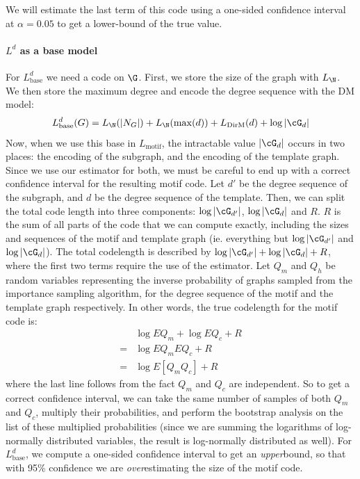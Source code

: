 We will estimate the last term of this code using a one-sided confidence interval at $\alpha=0.05$ to get a lower-bound of the true value. 

\paragraph{$L^d$ as a base model} For $L^d_\text{base}$ we need a code on $\G$. First, we store the size of the graph with $L_\N$. We then store the maximum degree and encode the degree sequence with the DM model:
\[
L^d_\text{base}(G) = L_\N(|N_G|) + L_\N(\max(d)) + L_\text{DirM}(d) + \log |\cG_d|  
\]
Now, when we use this base in $L_\text{motif}$, the intractable value $|\cG_d|$ occurs in two places: the encoding of the subgraph, and the encoding of the template graph. Since we use our estimator for both, we must be careful to end up with a correct confidence interval for the resulting motif code. Let $d'$ be the degree sequence of the subgraph, and $d$ be the degree sequence of the template. Then, we can split the total code length into three components: $\log |\cG_{d'}|$, $\log |\cG_d|$ and $R$. $R$ is the sum of all parts of the code that we can compute exactly, including the sizes and sequences of the motif and template graph (ie. everything but $\log |\cG_{d'}|$ and $\log |\cG_d|$). The total codelength is described by $\log |\cG_{d'}| + \log |\cG_d| + R$, where the first two terms require the use of the estimator. Let $Q_m$ and $Q_h$ be random variables representing the inverse probability of graphs sampled from the importance sampling algorithm, for the degree sequence of the motif and the template graph respectively. In other words, the true codelength for the motif code is:
\begin{align*}
& \log E Q_m + \log  E Q_c + R \\ 
= & \log E Q_m E Q_c + R \\
= & \log E [Q_m Q_c] + R
\end{align*}
where the last line follows from the fact $Q_m$ and $Q_c$ are independent. So to get a correct confidence interval, we can take the same number of samples of both $Q_m$ and $Q_c$, multiply their probabilities, and perform the bootstrap analysis on the list of these multiplied probabilities (since we are summing the logarithms of log-normally distributed variables, the result is log-normally distributed as well). 
For $L_\text{base}^d$, we compute a one-sided confidence interval to get an \emph{upper}bound, so that with 95\% confidence we are \emph{over}estimating the size of the motif code. 

